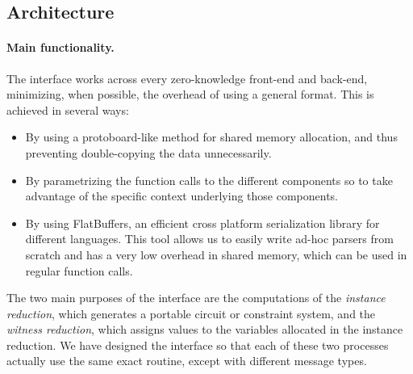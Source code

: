 \subsection{Architecture}

		
		
\paragraph{Main functionality.}

The interface works across every zero-knowledge front-end and back-end, minimizing, when possible, the overhead of using a general format. This is achieved in several ways:

\begin{itemize}
	\item By using a protoboard-like method for shared memory allocation, and thus preventing double-copying the data unnecessarily.
	\item By parametrizing the function calls to the different components so to take advantage of the specific context underlying those components.
	\item By using FlatBuffers, an efficient cross platform serialization library for different languages. This tool allows us to easily write ad-hoc parsers from scratch and has a very low overhead in shared memory, which can be used in regular function calls. 
\end{itemize}
		
        
The two main purposes of the interface are the computations of the \emph{instance reduction}, which generates a portable circuit or constraint system, and the \emph{witness reduction}, which assigns values to the variables allocated in the instance reduction. We have designed the interface so that each of these two processes actually use the same exact routine, except with different message types.

